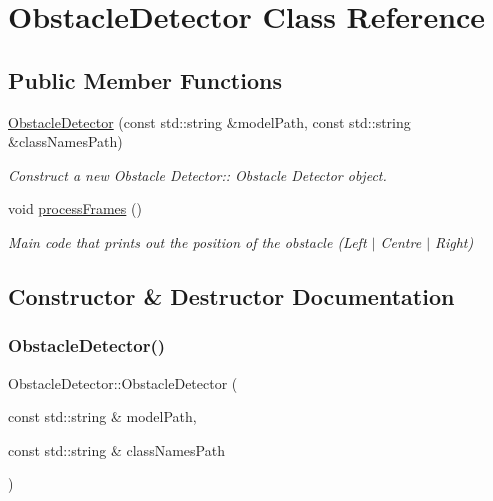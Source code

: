 \hypertarget{classObstacleDetector}{}\section{Obstacle\+Detector Class Reference}
\label{classObstacleDetector}
\subsection*{Public Member Functions}
\begin{DoxyCompactItemize}
\item 
\hyperlink{classObstacleDetector_a48e45d1d34c72092ea9b13b81886342c}{Obstacle\+Detector} (const std\+::string \&model\+Path, const std\+::string \&class\+Names\+Path)
\begin{DoxyCompactList}\small\item\em Construct a new Obstacle Detector\+:\+: Obstacle Detector object. \end{DoxyCompactList}\item 
\mbox{\label{classObstacleDetector_a2ecde56ab4f7e9cd0e600b53401da404}} 
void \hyperlink{classObstacleDetector_a2ecde56ab4f7e9cd0e600b53401da404}{process\+Frames} ()
\begin{DoxyCompactList}\small\item\em Main code that prints out the position of the obstacle (Left $\vert$ Centre $\vert$ Right) \end{DoxyCompactList}\end{DoxyCompactItemize}


\subsection{Constructor \& Destructor Documentation}
\mbox{\label{classObstacleDetector_a48e45d1d34c72092ea9b13b81886342c}} 
\subsubsection{\texorpdfstring{Obstacle\+Detector()}{ObstacleDetector()}}
{\footnotesize\ttfamily Obstacle\+Detector\+::\+Obstacle\+Detector (\begin{DoxyParamCaption}\item[{const std\+::string \&}]{model\+Path,  }\item[{const std\+::string \&}]{class\+Names\+Path }\end{DoxyParamCaption})}



